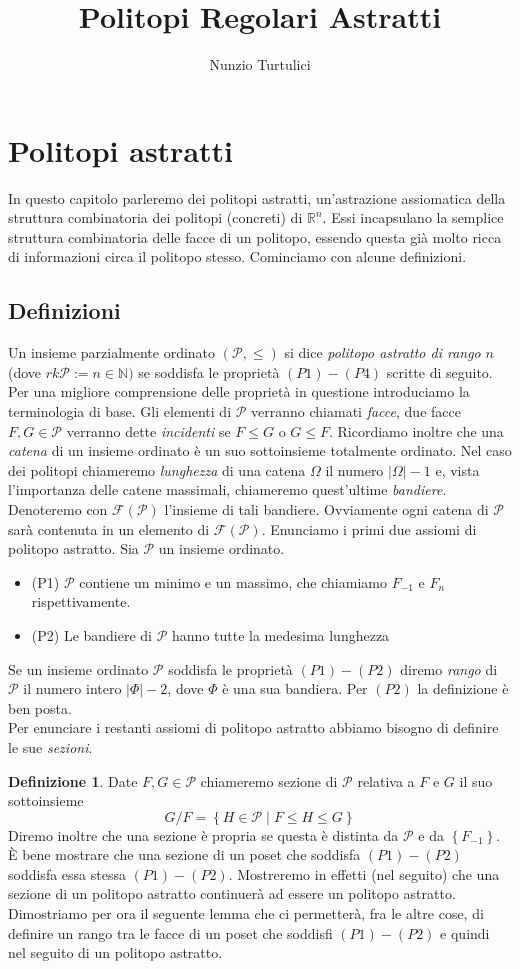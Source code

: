 \documentclass[a4paper,12pt]{report}
\author{Nunzio Turtulici}
\title{Politopi Regolari Astratti}
\newcommand{\Rn}{\mathbb{R}^n}
\newcommand{\p}{\mathcal{P}}
\theoremstyle{plain}
\theoremstyle{definition}
\newtheorem{defin}[teo]{Definizione}
\begin{document}
\section{Politopi astratti}
In questo capitolo parleremo dei politopi astratti, un'astrazione assiomatica della struttura combinatoria dei politopi (concreti) di $\Rn$. Essi incapsulano la
semplice struttura combinatoria delle facce di un politopo, essendo questa gi\`a molto ricca di informazioni circa il politopo stesso. Cominciamo con alcune 
definizioni.
\subsection{Definizioni}
Un insieme parzialmente ordinato $(\p,\leq)$ si dice \emph{politopo astratto di rango} $n$ (dove $rk\p:=n\in\mathbb{N})$ se soddisfa le propriet\`a $(P1)-(P4)$ scritte 
di seguito. Per una migliore comprensione delle propriet\`a in questione introduciamo la terminologia di base. Gli elementi di $\p$ verranno chiamati \emph{facce},
due facce $F,G\in\p$ verranno dette \emph{incidenti} se $F\leq G$ o $G\leq F$. Ricordiamo inoltre che una \emph{catena} di un insieme ordinato \`e un suo 
sottoinsieme totalmente ordinato. Nel caso dei politopi chiameremo \emph{lunghezza} di una catena $\Omega$ il numero $\left|\Omega\right|-1$ e, vista
l'importanza delle catene massimali, chiameremo quest'ultime \emph{bandiere}.
Denoteremo con $\mathcal{F}(\p)$ l'insieme di tali bandiere. Ovviamente ogni catena di $\p$ sar\`a contenuta in un elemento di $\mathcal{F}(\p)$.
Enunciamo i primi due assiomi di politopo astratto. Sia $\p$ un insieme ordinato.
\begin{itemize}
\item (P1) $\p$ contiene un minimo e un massimo, che chiamiamo $F_{-1}$ e $F_n$ rispettivamente.
\item (P2) Le bandiere di $\p$ hanno tutte la medesima lunghezza
\end{itemize}
Se un insieme ordinato $\p$ soddisfa le propriet\`a $(P1)-(P2)$ diremo \emph{rango} di $\p$ il numero intero  $\left|\Phi\right|-2$, dove
$\Phi$ \`e una sua bandiera. Per $(P2)$ la definizione \`e ben posta.\\
Per enunciare i restanti assiomi di politopo astratto abbiamo bisogno di definire le sue \emph{sezioni}.
\begin{defin}
Date $F,G\in\p$ chiameremo sezione di $\p$ relativa a $F$ e $G$ il suo sottoinsieme
\begin{equation*}
G/F=\left\{H\in\p\mid F\leq H\leq G\right\}
\end{equation*}
Diremo inoltre che una sezione \`e propria se questa \`e distinta da $\p$ e da $\left\{F_{-1}\right\}$.
\`E bene mostrare che una sezione di un poset che soddisfa $(P1)-(P2)$ soddisfa essa stessa $(P1)-(P2)$. Mostreremo in effetti (nel seguito) che una sezione
 di un politopo astratto continuer\`a ad essere un politopo astratto. Dimostriamo per ora il seguente lemma che ci permetter\`a, fra le altre cose,
 di definire un rango tra le facce di un poset che soddisfi $(P1)-(P2)$ e quindi nel seguito di un politopo astratto.
\end{defin}
\end{document}

